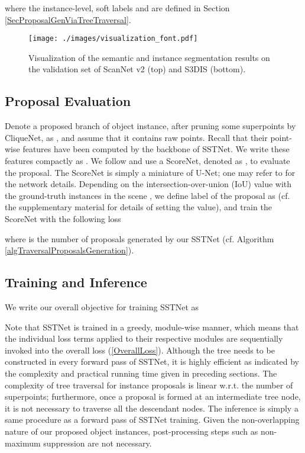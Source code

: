 \documentclass[10pt,twocolumn,letterpaper]{article}
\begin{document}
where the instance-level, soft labels  and  are defined in Section \ref{SecProposalGenViaTreeTraversal}.


\begin{figure*}
    \centering
    \texttt{[image: ./images/visualization\_font.pdf]}
    \caption{Visualization of the semantic and instance segmentation results on the validation set of ScanNet v2 (top) and S3DIS (bottom).}
    \label{figVisualization}
\end{figure*}

\subsection{Proposal Evaluation}
\label{SecScoreNet}

Denote a proposed branch of object instance, after pruning some superpoints by CliqueNet, as , and assume that it contains  raw points. Recall that their point-wise features have been computed by the backbone of SSTNet. We write these features compactly as . We follow \cite{jiang2020pointgroup} and use a ScoreNet, denoted as , to evaluate the proposal. The ScoreNet is simply a miniature of U-Net; one may refer to \cite{jiang2020pointgroup} for the network details. Depending on the intersection-over-union (IoU) value with the ground-truth instances in the scene , we define label of the proposal as  (cf. the supplementary material for details of setting the  value), and train the ScoreNet with the following loss

where  is the number of proposals generated by our SSTNet (cf. Algorithm \ref{algTraversalProposalsGeneration}).

\subsection{Training and Inference}
\label{SecTrainInference}

We write our overall objective for training SSTNet as

Note that SSTNet is trained in a greedy, module-wise manner, which means that the individual loss terms applied to their respective modules are sequentially invoked into the overall loss (\ref{OverallLoss}). Although the tree  needs to be constructed in every forward pass of SSTNet, it is highly efficient as indicated by the complexity and practical running time given in preceding sections. The complexity of tree traversal for instance proposals is linear w.r.t. the number of superpoints; furthermore, once a proposal is formed at an intermediate tree node, it is not necessary to traverse all the descendant nodes. The inference is simply a same procedure as a forward pass of SSTNet training. Given the non-overlapping nature of our proposed object instances, post-processing steps such as non-maximum suppression are not necessary.
\end{document}
